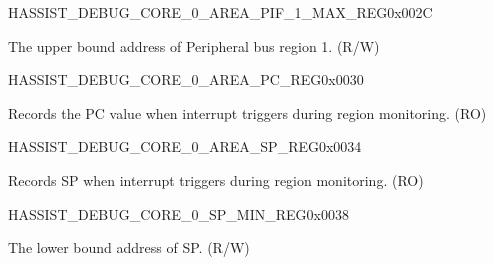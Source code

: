 \begin{register}{H}{ASSIST\_DEBUG\_CORE\_0\_AREA\_PIF\_1\_MAX\_REG}{0x002C}\label{regdesc:ASSISTDEBUGCORE0AREAPIF1MAXREG}
%
\regnewline%
\begin{regdesc}\begin{reglist}
\label{fielddesc:ASSISTDEBUGCORE0AREAPIF1MAX}\item [ASSIST\_DEBUG\_CORE\_0\_AREA\_PIF\_1\_MAX] The upper bound address of Peripheral bus region 1. (R/W)
\end{reglist}\end{regdesc}
\end{register}


\begin{register}{H}{ASSIST\_DEBUG\_CORE\_0\_AREA\_PC\_REG}{0x0030}\label{regdesc:ASSISTDEBUGCORE0AREAPCREG}
%
\regnewline%
\begin{regdesc}\begin{reglist}
\label{fielddesc:ASSISTDEBUGCORE0AREAPC}\item [ASSIST\_DEBUG\_CORE\_0\_AREA\_PC] Records the PC value when interrupt triggers during region monitoring. (RO)
\end{reglist}\end{regdesc}
\end{register}


\begin{register}{H}{ASSIST\_DEBUG\_CORE\_0\_AREA\_SP\_REG}{0x0034}\label{regdesc:ASSISTDEBUGCORE0AREASPREG}
%
\regnewline%
\begin{regdesc}\begin{reglist}
\label{fielddesc:ASSISTDEBUGCORE0AREASP}\item [ASSIST\_DEBUG\_CORE\_0\_AREA\_SP] Records SP when interrupt triggers during region monitoring. (RO)
\end{reglist}\end{regdesc}
\end{register}


\begin{register}{H}{ASSIST\_DEBUG\_CORE\_0\_SP\_MIN\_REG}{0x0038}\label{regdesc:ASSISTDEBUGCORE0SPMINREG}
%
\regnewline%
\begin{regdesc}\begin{reglist}
\label{fielddesc:ASSISTDEBUGCORE0SPMIN}\item [ASSIST\_DEBUG\_CORE\_0\_SP\_MIN] The lower bound address of SP. (R/W)
\end{reglist}\end{regdesc}
\end{register}


